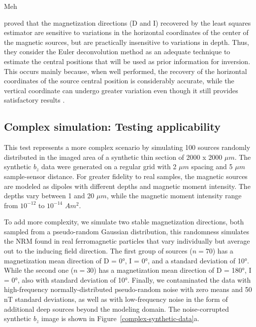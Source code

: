 \begin{table}[t]
  \begin{center}
    \small
    
  \end{center}
  \caption{Meh}
  \label{tab_synthetic_simple_results}
\end{table}

\citet{Oliveira2015Estimation} proved that the magnetization directions (D and I) recovered by the least squares estimator are sensitive to variations in the horizontal coordinates of the center of the magnetic sources, but are practically insensitive to variations in depth. Thus, they consider the Euler deconvolution method as an adequate technique to estimate the central positions that will be used as prior information for inversion. This occurs mainly because, when well performed, the recovery of the horizontal coordinates of the source central position is considerably accurate, while the vertical coordinate can undergo greater variation even though it still provides satisfactory results \citep{Silva20033D, Melo2013}.


\subsection{Complex simulation: Testing applicability}

This test represents a more complex scenario by simulating 100 sources randomly distributed in the imaged area of a synthetic thin section of 2000 x 2000 $\mu m$. The synthetic $b_z$ data were generated on a regular grid with 2 $\mu m$ spacing and 5 $\mu m$ sample-sensor distance. For greater fidelity to real samples, the magnetic sources are modeled as dipoles with different depths and magnetic moment intensity. The depths vary between 1 and 20 $\mu m$, while the magnetic moment intensity range from $10^{-12}$ to $10^{-14}$ $Am^2$. 

To add more complexity, we simulate two stable magnetization  directions, both sampled from a pseudo-random Gaussian distribution, this randomness simulates the NRM found in real ferromagnetic particles that vary individually but average out to the inducing field direction. The first group of sources ($n = 70$) has a magnetization mean direction of D = 0°, I = 0°, and a standard deviation of 10°. While the second one ($n = 30$) has a magnetization mean direction of D = 180°, I = 0°, also with standard deviation of 10°. Finally, we contaminated the data with high-frequency normally-distributed pseudo-random noise with zero means and 50 nT standard deviations, as well as with low-frequency noise in the form of additional deep sources beyond the modeling domain. The noise-corrupted synthetic $b_z$ image is shown in Figure~\ref{complex-synthetic-data}a.


